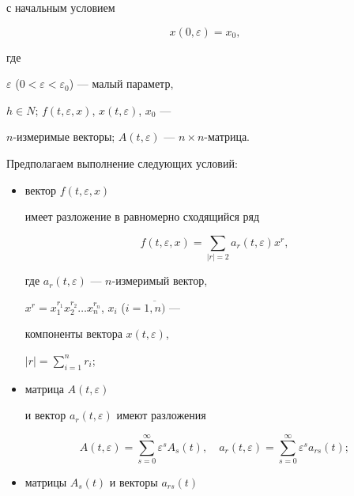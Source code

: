 с начальным условием


\begin{equation}


x(0,\varepsilon)=x_{0},


\end{equation}


где


$\varepsilon$ ($0<\varepsilon<\varepsilon_{0}$) --- малый параметр,


$h\in N$; $f(t,\varepsilon,x)$, $x(t,\varepsilon)$, $x_{0}$ ---


$n$-измеримые векторы; $A(t,\varepsilon)$ --- $n\times n $-матрица.


Предполагаем выполнение следующих условий:


\begin{itemize}


\item[1)] вектор $f(t,\varepsilon,x)$


имеет разложение в равномерно сходящийся ряд


\begin{equation*}


f(t,\varepsilon,x)=\sum\limits_{|r|=2}a_{r}


(t,\varepsilon)x^{r},


\end{equation*}


где $a_{r}(t,\varepsilon)$ --- $n$-измеримый вектор,


$x^{r}=x^{r_{1}}_{1}x^{r_{2}}_{2}\dotsc


x^{r_{n}}_{n}$, $x_{i}$ ($i=\overline{1,n)}$ ---


компоненты вектора $x(t,\varepsilon)$,


$|r|=\sum\limits_{i=1}^{n}r_{i}$;


\item[2)] матрица $A(t,\varepsilon)$


и вектор $ a_{r} (t,\varepsilon)$ имеют разложения


\begin{equation*}


A(t,\varepsilon)=\sum_{s=0}^{\infty}\varepsilon^{s}A_{s}(t),\quad


a_{r}(t,\varepsilon)=\sum_{s=0}^{\infty}\varepsilon ^{s}a_{rs}(t);


\end{equation*}


\item[3)] матрицы $A_{s}(t)$ и векторы $a_{rs} (t)$



\end{itemize}
